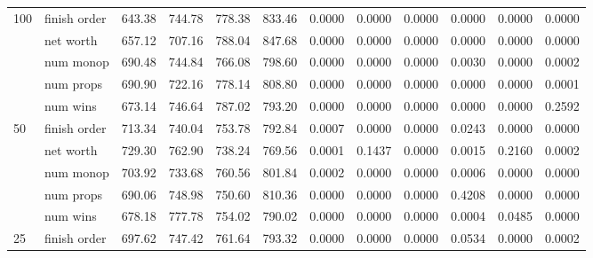 \begin{landscape}
\begin{table}[ht]
\begin{tabularx}{\linewidth}{|p{1in}|p{1in}|r|r|r|r|r|r|r|r|r|r|}
      \multirow{5}{*}{100} & finish order & 643.38 & 744.78 & \cellcolor{green!55!white}778.38 & \cellcolor{green!55!white}833.46 & 0.0000 & 0.0000 & 0.0000 & 0.0000 & 0.0000 & 0.0000 \\
\cline{2-12}       & net worth & 657.12 & 707.16 & \cellcolor{green!55!white}788.04 & \cellcolor{green!55!white}847.68 & 0.0000 & 0.0000 & 0.0000 & 0.0000 & 0.0000 & 0.0000 \\
\cline{2-12}       & num monop & 690.48 & 744.84 & \cellcolor{green!55!white}766.08 & \cellcolor{green!55!white}798.60 & 0.0000 & 0.0000 & 0.0000 & 0.0030 & 0.0000 & 0.0002 \\
\cline{2-12}       & num props & 690.90 & 722.16 & \cellcolor{green!55!white}778.14 & \cellcolor{green!55!white}808.80 & 0.0000 & 0.0000 & 0.0000 & 0.0000 & 0.0000 & 0.0001 \\
\cline{2-12}       & num wins & 673.14 & 746.64 & \cellcolor{green!55!white}787.02 & \cellcolor{green!55!white}793.20 & 0.0000 & 0.0000 & 0.0000 & 0.0000 & 0.0000 & \cellcolor{red!55!white}0.2592 \\
      \cline{1-12}
      \multirow{5}{*}{50} & finish order & 713.34 & 740.04 & \cellcolor{green!55!white}753.78 & \cellcolor{green!55!white}792.84 & 0.0007 & 0.0000 & 0.0000 & \cellcolor{red!55!white}0.0243 & 0.0000 & 0.0000 \\
\cline{2-12}       & net worth & 729.30 & \cellcolor{green!55!white}762.90 & 738.24 & \cellcolor{green!55!white}769.56 & 0.0001 & \cellcolor{red!55!white}0.1437 & 0.0000 & 0.0015 & \cellcolor{red!55!white}0.2160 & 0.0002 \\
\cline{2-12}       & num monop & 703.92 & 733.68 & \cellcolor{green!55!white}760.56 & \cellcolor{green!55!white}801.84 & 0.0002 & 0.0000 & 0.0000 & 0.0006 & 0.0000 & 0.0000 \\
\cline{2-12}       & num props & 690.06 & 748.98 & \cellcolor{green!55!white}750.60 & \cellcolor{green!55!white}810.36 & 0.0000 & 0.0000 & 0.0000 & \cellcolor{red!55!white}0.4208 & 0.0000 & 0.0000 \\
\cline{2-12}       & num wins & 678.18 & \cellcolor{green!55!white}777.78 & \cellcolor{green!55!white}754.02 & \cellcolor{green!55!white}790.02 & 0.0000 & 0.0000 & 0.0000 & 0.0004 & \cellcolor{red!55!white}0.0485 & 0.0000 \\
      \cline{1-12}
      \multirow{5}{*}{25} & finish order & 697.62 & 747.42 & \cellcolor{green!55!white}761.64 & \cellcolor{green!55!white}793.32 & 0.0000 & 0.0000 & 0.0000 & \cellcolor{red!55!white}0.0534 & 0.0000 & 0.0002 \\

\end{tabularx}
\end{table}
\end{landscape}
